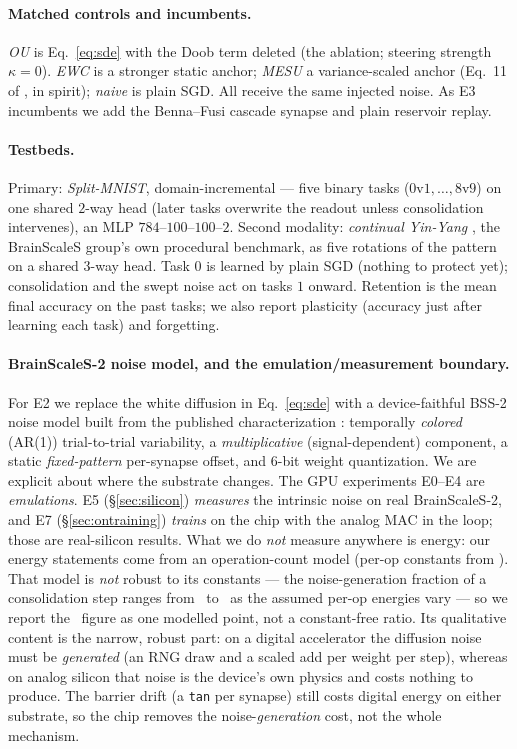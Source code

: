 \documentclass[11pt]{article}
\begin{document}
\paragraph{Matched controls and incumbents.}
\emph{OU} is Eq.~\eqref{eq:sde} with the Doob term deleted (the ablation; steering
strength $\kappa{=}0$). \emph{EWC} is a stronger static anchor; \emph{MESU} a
variance-scaled anchor (Eq.~11 of \citealp{mesu2025}, in spirit); \emph{naive} is
plain SGD. All receive the same injected noise. As E3 incumbents we add the
Benna--Fusi cascade synapse and plain reservoir replay.

\paragraph{Testbeds.}
Primary: \emph{Split-MNIST}, domain-incremental --- five binary tasks
($0$v$1,\dots,8$v$9$) on one shared $2$-way head (later tasks overwrite the readout
unless consolidation intervenes), an MLP $784$--$100$--$100$--$2$. Second modality:
\emph{continual Yin-Yang} \citep{kriener2022}, the BrainScaleS group's own
procedural benchmark, as five rotations of the pattern on a shared $3$-way head.
Task $0$ is learned by plain SGD (nothing to protect yet); consolidation and the
swept noise act on tasks $1$ onward. Retention is the mean final accuracy on the
past tasks; we also report plasticity (accuracy just after learning each task) and
forgetting.

\paragraph{BrainScaleS-2 noise model, and the emulation/measurement boundary.}
For E2 we replace the white diffusion in Eq.~\eqref{eq:sde} with a device-faithful
BSS-2 noise model built from the published characterization
\citep{weis2020,pehle2022}: temporally \emph{colored} (AR(1)) trial-to-trial
variability, a \emph{multiplicative} (signal-dependent) component, a static
\emph{fixed-pattern} per-synapse offset, and $6$-bit weight quantization. We are
explicit about where the substrate changes. The GPU experiments E0--E4 are
\emph{emulations}. E5 (\S\ref{sec:silicon}) \emph{measures} the intrinsic noise on
real BrainScaleS-2, and E7 (\S\ref{sec:ontraining}) \emph{trains} on the chip with
the analog MAC in the loop; those are real-silicon results. What we do \emph{not}
measure anywhere is energy: our energy statements come from an operation-count model
(per-op constants from \citealp{horowitz2014}). That model is \emph{not} robust to
its constants --- the noise-generation fraction of a consolidation step ranges from
\NoiseTaxLoPct\ to \NoiseTaxHiPct\ as the assumed per-op energies vary --- so we
report the \NoiseTaxPct\ figure as one modelled point, not a constant-free ratio. Its
qualitative content is the narrow, robust part: on a digital accelerator the
diffusion noise must be \emph{generated} (an RNG draw and a scaled add per weight per
step), whereas on analog silicon that noise is the device's own physics and costs
nothing to produce. The barrier drift (a \texttt{tan} per synapse) still costs
digital energy on either substrate, so the chip removes the noise-\emph{generation}
cost, not the whole mechanism.
\end{document}
